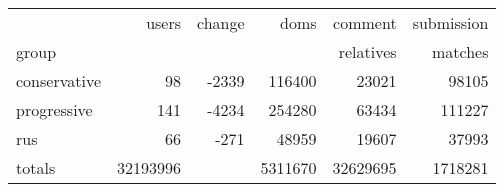 \begin{tabular}{lrrrrr}
\toprule
{}    & users & change & doms & comment   & submission \\
group &       &        &      & relatives & matches    \\
\midrule
   conservative &        98 &   -2339 &   116400 &              23021 &               98105 \\
   progressive &       141 &   -4234 &   254280 &              63434 &              111227 \\
    rus &        66 &    -271 &    48959 &              19607 &               37993 \\
 totals &  32193996 &        &  5311670 &           32629695 &             1718281 \\
\bottomrule
\end{tabular}
